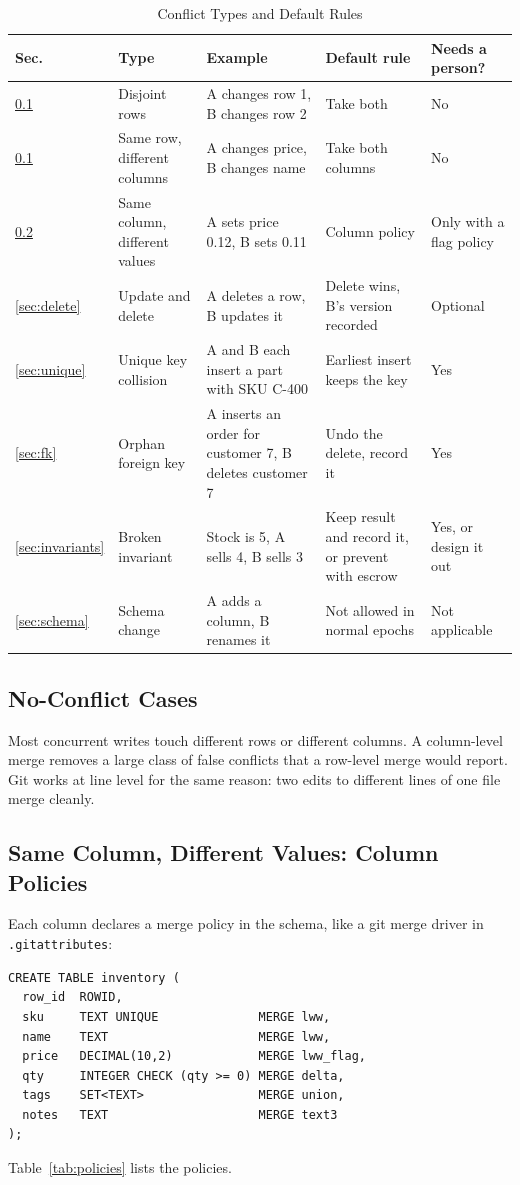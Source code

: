 \documentclass[journal]{IEEEtran}
\newcommand{\code}[1]{\texttt{#1}}
\begin{document}
\begin{table}[t]
\caption{Conflict Types and Default Rules}\label{tab:taxonomy}
\centering\small
\begin{tabular}{@{}l L{3.2cm} L{4.6cm} L{3.4cm} L{2.6cm}@{}}
\toprule
Sec. & Type & Example & Default rule & Needs a person?\\
\midrule
\ref{sec:nonconf} & Disjoint rows & A changes row 1, B changes row 2 & Take both & No\\
\ref{sec:nonconf} & Same row, different columns & A changes price, B changes name & Take both columns & No\\
\ref{sec:policies} & Same column, different values & A sets price 0.12, B sets 0.11 & Column policy & Only with a flag policy\\
\ref{sec:delete} & Update and delete & A deletes a row, B updates it & Delete wins, B's version recorded & Optional\\
\ref{sec:unique} & Unique key collision & A and B each insert a part with SKU C-400 & Earliest insert keeps the key & Yes\\
\ref{sec:fk} & Orphan foreign key & A inserts an order for customer 7, B deletes customer 7 & Undo the delete, record it & Yes\\
\ref{sec:invariants} & Broken invariant & Stock is 5, A sells 4, B sells 3 & Keep result and record it, or prevent with escrow & Yes, or design it out\\
\ref{sec:schema} & Schema change & A adds a column, B renames it & Not allowed in normal epochs & Not applicable\\
\bottomrule
\end{tabular}
\end{table}

\subsection{No-Conflict Cases}\label{sec:nonconf}
Most concurrent writes touch different rows or different columns. A column-level merge removes a large class of false conflicts that a row-level merge would report. Git works at line level for the same reason: two edits to different lines of one file merge cleanly.

\subsection{Same Column, Different Values: Column Policies}\label{sec:policies}
Each column declares a merge policy in the schema, like a git merge driver in \code{.gitattributes}:
\begin{lstlisting}
CREATE TABLE inventory (
  row_id  ROWID,
  sku     TEXT UNIQUE              MERGE lww,
  name    TEXT                     MERGE lww,
  price   DECIMAL(10,2)            MERGE lww_flag,
  qty     INTEGER CHECK (qty >= 0) MERGE delta,
  tags    SET<TEXT>                MERGE union,
  notes   TEXT                     MERGE text3
);
\end{lstlisting}
Table~\ref{tab:policies} lists the policies.
\end{document}
